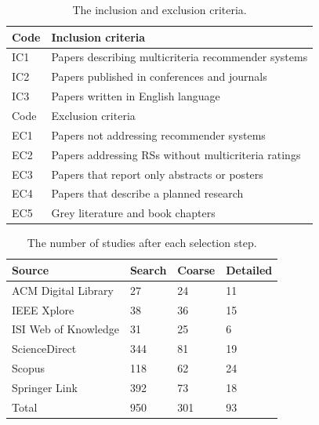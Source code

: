 \begin{table}
\centering
\begin{tabular}{@{}ll@{}}
\toprule
Code & Inclusion criteria \\ \midrule
IC1 & Papers describing multicriteria recommender systems \\
IC2 & Papers published in conferences and journals \\
IC3 & Papers written in English language \\ \midrule
Code & Exclusion criteria \\ \midrule
EC1 & Papers not addressing recommender systems \\
EC2 & Papers addressing RSs without multicriteria ratings \\
EC3 & Papers that report only abstracts or posters \\
EC4 & Papers that describe a planned research\footnotemark \\
EC5 & Grey literature and book chapters \\ \bottomrule
\end{tabular}
\caption[Inclusion and exclusion criteria]{The inclusion and exclusion criteria.}
\label{mcr:tab:criteria}
\end{table}

\begin{table}
\centering
\begin{tabular}{@{}llll@{}}
\toprule
Source               & Search & Coarse & Detailed \\ \midrule
ACM Digital Library  & 27     & 24     & 11       \\
IEEE Xplore          & 38     & 36     & 15       \\
ISI Web of Knowledge & 31     & 25     & 6        \\
ScienceDirect        & 344    & 81     & 19       \\
Scopus               & 118    & 62     & 24       \\
Springer Link        & 392    & 73     & 18       \\ \midrule
Total                & 950    & 301    & 93       \\ \bottomrule
\end{tabular}
\caption[Studies per selection step]{The number of studies after each selection step.}
\label{mcr:tab:numbers}
\end{table}

